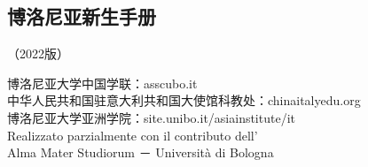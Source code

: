 
\begin{titlepage}                  
% 


\topmargin=-2cm   
\chapter*{博洛尼亚新生手册}                 %
\pagestyle{empty}%
\thispagestyle{empty} 
	\begin{center}
	（2022版）
	\end{center}



\vspace*{12cm}
\begin{center}
博洛尼亚大学中国学联：asscubo.it\\
中华人民共和国驻意大利共和国大使馆科教处：chinaitalyedu.org\\
博洛尼亚大学亚洲学院：site.unibo.it/asiainstitute/it\\

Realizzato parzialmente con il contributo dell'\\
Alma Mater Studiorum － Università di Bologna
\end{center}


\end{titlepage}
